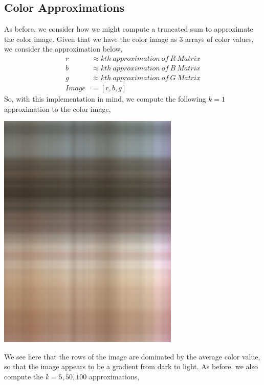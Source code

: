 \documentclass[letterpaper,12pt]{article}
\begin{document}
\subsection{Color Approximations}
As before, we consider how we might compute a truncated sum to approximate the color image. Given that we have the color image as 3 arrays of color values, we consider the approximation below,
\begin{align*}
r &\approx kth\ approximation\ of\ R\ Matrix\\
b &\approx kth\ approximation\ of\ B\ Matrix\\
g &\approx kth\ approximation\ of\ G\ Matrix\\
Image &= [r,b,g]
\end{align*}
So, with this implementation in mind, we compute the following $k=1$ approximation to the color image,
\begin{center}
\includegraphics[scale=.6]{col1.png}
\end{center}
We see here that the rows of the image are dominated by the average color value, so that the image appears to be a gradient from dark to light. As before, we also compute the $k=5,50,100$ approximations,
\end{document}

